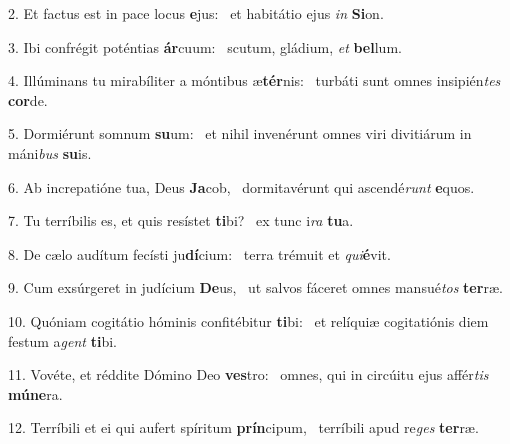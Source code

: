 2. Et factus est in pace locus \textbf{e}jus: \ast\  et habitátio ejus \textit{in} \textbf{Si}on.\

3. Ibi confrégit poténtias \textbf{ár}cuum: \ast\  scutum, gládium, \textit{et} \textbf{bel}lum.\

4. Illúminans tu mirabíliter a móntibus æ\textbf{tér}nis: \ast\  turbáti sunt omnes insipién\textit{tes} \textbf{cor}de.\

5. Dormiérunt somnum \textbf{su}um: \ast\  et nihil invenérunt omnes viri divitiárum in máni\textit{bus} \textbf{su}is.\

6. Ab increpatióne tua, Deus \textbf{Ja}cob, \ast\  dormitavérunt qui ascendé\textit{runt} \textbf{e}quos.\

7. Tu terríbilis es, et quis resístet \textbf{ti}bi? \ast\  ex tunc i\textit{ra} \textbf{tu}a.\

8. De cælo audítum fecísti ju\textbf{dí}cium: \ast\  terra trémuit et \textit{qui}\textbf{é}vit.\

9. Cum exsúrgeret in judícium \textbf{De}us, \ast\  ut salvos fáceret omnes mansué\textit{tos} \textbf{ter}ræ.\

10. Quóniam cogitátio hóminis confitébitur \textbf{ti}bi: \ast\  et relíquiæ cogitatiónis diem festum a\textit{gent} \textbf{ti}bi.\

11. Vovéte, et réddite Dómino Deo \textbf{ves}tro: \ast\  omnes, qui in circúitu ejus affér\textit{tis} \textbf{mú}\textbf{ne}ra.\

12. Terríbili et ei qui aufert spíritum \textbf{prín}cipum, \ast\  terríbili apud re\textit{ges} \textbf{ter}ræ.\

